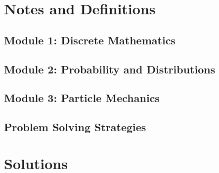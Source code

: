 \documentclass{solutionsmannual}
\begin{document}
\part{Notes and Definitions}
\chapter{Module 1: Discrete Mathematics}

\chapter{Module 2: Probability and Distributions}

\chapter{Module 3: Particle Mechanics}

\chapter{Problem Solving Strategies}

\part{Solutions}


\end{document}
